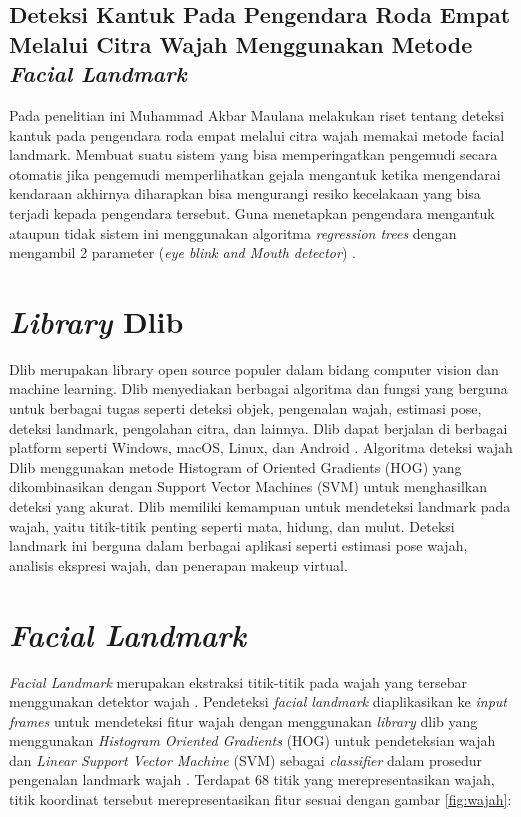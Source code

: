 \subsection{Deteksi Kantuk Pada Pengendara Roda Empat Melalui Citra Wajah Menggunakan Metode \emph{Facial Landmark}}
Pada penelitian ini Muhammad Akbar Maulana melakukan riset tentang deteksi kantuk pada pengendara roda empat melalui
citra wajah memakai metode facial landmark. Membuat suatu sistem yang bisa memperingatkan pengemudi secara otomatis
jika pengemudi memperlihatkan gejala mengantuk ketika mengendarai kendaraan akhirnya diharapkan bisa mengurangi
resiko kecelakaan yang bisa terjadi kepada pengendara tersebut. Guna menetapkan pengendara mengantuk ataupun tidak
sistem ini menggunakan algoritma \emph{regression trees} dengan mengambil 2 parameter (\emph{eye blink and Mouth detector}) \parencite{12}.

\section{\emph{Library} Dlib}

Dlib merupakan library open source populer dalam bidang computer vision dan
machine learning. Dlib menyediakan berbagai algoritma dan fungsi yang berguna untuk
berbagai tugas seperti deteksi objek, pengenalan wajah, estimasi pose, deteksi landmark,
pengolahan citra, dan lainnya. Dlib dapat berjalan di berbagai platform seperti Windows,
macOS, Linux, dan Android \parencite{14}. Algoritma deteksi wajah Dlib menggunakan
metode Histogram of Oriented Gradients (HOG) yang dikombinasikan dengan Support Vector
Machines (SVM) untuk menghasilkan deteksi yang akurat. Dlib memiliki kemampuan untuk mendeteksi landmark pada wajah,
yaitu titik-titik penting seperti mata, hidung, dan mulut. Deteksi landmark ini berguna
dalam berbagai aplikasi seperti estimasi pose wajah, analisis ekspresi wajah, dan
penerapan makeup virtual.

\section{\emph{Facial Landmark}}
\emph{Facial Landmark} merupakan ekstraksi titik-titik pada wajah yang tersebar menggunakan detektor wajah \parencite{15}.  Pendeteksi
\emph{facial landmark} diaplikasikan ke \emph{input frames} untuk mendeteksi fitur wajah dengan menggunakan \emph{library} dlib yang
menggunakan \emph{Histogram Oriented Gradients} (HOG) untuk pendeteksian wajah dan \emph{Linear Support Vector Machine} (SVM)
sebagai \emph{classifier} dalam prosedur pengenalan landmark wajah \parencite{16}. Terdapat 68 titik yang merepresentasikan wajah,
titik koordinat tersebut merepresentasikan fitur sesuai dengan gambar \ref{fig:wajah}:

